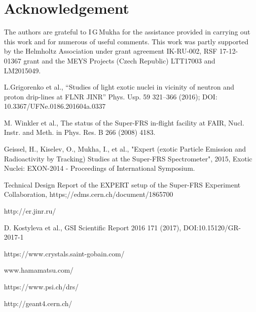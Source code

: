 \documentclass{webofc}
\newcommand{\er}{\textmd{EXPERTroot}}
\begin{document}
	
	
\section{Acknowledgement}
The authors are grateful to I\,G\,Mukha for the assistance provided in carrying out this work and for numerous of useful comments.
This  work was partly supported by the Helmholtz Association under grant agreement IK-RU-002, RSF 17-12-01367 grant and the MEYS Projects (Czech Republic) LTT17003 and LM2015049.
	
\begin{thebibliography}{99}
	L.Grigorenko et al., “Studies of light exotic nuclei in vicinity of neutron and proton drip-lines at FLNR JINR” Phys. Usp. 59 321–366 (2016); DOI: 10.3367/UFNe.0186.201604a.0337
		
	M. Winkler et al., The status of the Super-FRS in-flight facility at FAIR, Nucl. Instr. and Meth. in Phys. Res. B 266 (2008) 4183.
	
	Geissel, H., Kiselev, O., Mukha, I., et al., "Expert (exotic Particle Emission and Radioactivity by Tracking) Studies at the Super-FRS Spectrometer", 2015, Exotic Nuclei: EXON-2014 - Proceedings of International Symposium.
	
	Technical Design Report of the EXPERT setup of the Super-FRS Experiment Collaboration, https;//edms.cern.ch/document/1865700

	http://er.jinr.ru/

	D. Kostyleva et al., GSI Scientific Report 2016 171 (2017), DOI:10.15120/GR-2017-1
	
	https://www.crystals.saint-gobain.com/
	
	www.hamamatsu.com/
	
	https://www.psi.ch/drs/
	
	http://geant4.cern.ch/
	
	
\end{thebibliography}
\end{document}
